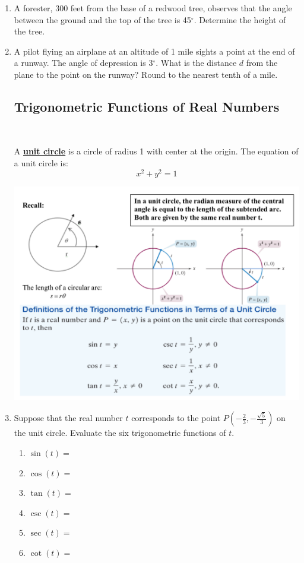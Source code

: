 \begin{enumerate}
\item A forester, 300 feet from the base of a redwood tree, observes that the angle between the ground and the top of the tree is 45$^\circ$.  Determine the height of the tree.

\vfill
\item A pilot flying an airplane at an altitude of 1 mile sights a point at the end of a runway.  The angle of depression is 3$^\circ$.  What is the distance $d$ from the plane to the point on the runway?  Round to the nearest tenth of a mile.
\vfill
\vfill

\newpage
\subsection{Trigonometric Functions of Real Numbers} ~

\noindent A \textbf{\underline{unit circle}} is a circle of radius 1 with center at the origin.  The equation of a unit circle is:
$$x^2+y^2=1$$

\includegraphics[scale=.6]{unitpic}

\newpage

\item Suppose that the real number $t$ corresponds to the point $P(-\frac{2}{3},-\frac{\sqrt{5}}{3})$ on the unit circle.  Evaluate the six trigonometric functions of $t$.
\begin{enumerate}
\item $\sin(t)=$\\[.5in]
\item $\cos(t)=$ \\[.5in]
\item $\tan(t)=$ \\[.5in]
\item $\csc(t)=$ \\[.5in]
\item $\sec(t)=$ \\[.5in]
\item $\cot(t)=$ \\[.5in]
\end{enumerate}



\end{enumerate}

